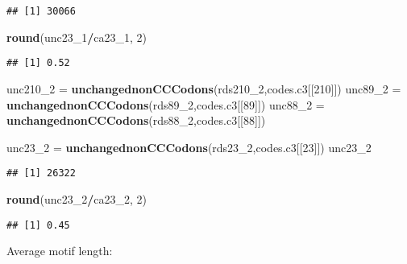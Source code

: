 \documentclass[
]{article}
\newenvironment{Shaded}{\begin{snugshade}}{\end{snugshade}}
\newcommand{\DecValTok}[1]{\textcolor[rgb]{0.00,0.00,0.81}{#1}}
\newcommand{\KeywordTok}[1]{\textcolor[rgb]{0.13,0.29,0.53}{\textbf{#1}}}
\newcommand{\NormalTok}[1]{#1}
\newcommand{\OperatorTok}[1]{\textcolor[rgb]{0.81,0.36,0.00}{\textbf{#1}}}
\newcommand{\StringTok}[1]{\textcolor[rgb]{0.31,0.60,0.02}{#1}}
\begin{document}
\begin{verbatim}
## [1] 30066
\end{verbatim}

\begin{Shaded}
\begin{Highlighting}[]
\KeywordTok{round}\NormalTok{(unc23_}\DecValTok{1}\OperatorTok{/}\NormalTok{ca23_}\DecValTok{1}\NormalTok{, }\DecValTok{2}\NormalTok{)}
\end{Highlighting}
\end{Shaded}

\begin{verbatim}
## [1] 0.52
\end{verbatim}

\begin{Shaded}
\begin{Highlighting}[]
\NormalTok{unc210_}\DecValTok{2}\NormalTok{ =}\StringTok{ }\KeywordTok{unchangednonCCCodons}\NormalTok{(rds210_}\DecValTok{2}\NormalTok{,codes.c3[[}\DecValTok{210}\NormalTok{]])}
\NormalTok{unc89_}\DecValTok{2}\NormalTok{ =}\StringTok{ }\KeywordTok{unchangednonCCCodons}\NormalTok{(rds89_}\DecValTok{2}\NormalTok{,codes.c3[[}\DecValTok{89}\NormalTok{]])}
\NormalTok{unc88_}\DecValTok{2}\NormalTok{ =}\StringTok{ }\KeywordTok{unchangednonCCCodons}\NormalTok{(rds88_}\DecValTok{2}\NormalTok{,codes.c3[[}\DecValTok{88}\NormalTok{]])}

\NormalTok{unc23_}\DecValTok{2}\NormalTok{ =}\StringTok{ }\KeywordTok{unchangednonCCCodons}\NormalTok{(rds23_}\DecValTok{2}\NormalTok{,codes.c3[[}\DecValTok{23}\NormalTok{]])}
\NormalTok{unc23_}\DecValTok{2}
\end{Highlighting}
\end{Shaded}

\begin{verbatim}
## [1] 26322
\end{verbatim}

\begin{Shaded}
\begin{Highlighting}[]
\KeywordTok{round}\NormalTok{(unc23_}\DecValTok{2}\OperatorTok{/}\NormalTok{ca23_}\DecValTok{2}\NormalTok{, }\DecValTok{2}\NormalTok{)}
\end{Highlighting}
\end{Shaded}

\begin{verbatim}
## [1] 0.45
\end{verbatim}

Average motif length:

\begin{Shaded}
\end{Shaded}
\end{document}
